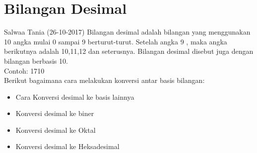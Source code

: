 \section{Bilangan Desimal} Salwaa Tania (26-10-2017)
Bilangan desimal adalah bilangan yang menggunakan 10 angka mulai 0 sampai 9 berturut-turut. Setelah angka 9 , maka angka berikutnya adalah 10,11,12 dan seterusnya. Bilangan desimal disebut juga dengan bilangan berbasis 10.
\\Contoh: 1710
\\Berikut bagaimana cara melakukan konversi antar basis bilangan: 
\begin{itemize}
	\item Cara Konversi desimal ke basis lainnya
	\item Konversi desimal ke biner
	\item Konversi desimal ke Oktal
	\item Konversi desimal ke Heksadesimal
\end{itemize}
